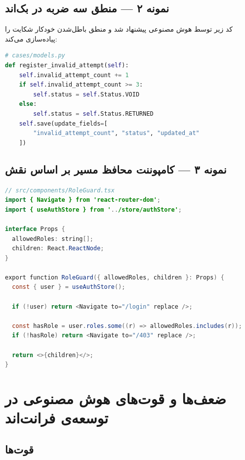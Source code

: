 \documentclass[12pt]{article} %
\theoremstyle{definition}
\begin{document}
\subsection{نمونه ۲ — منطق سه ضربه در بک‌اند}

کد زیر توسط هوش مصنوعی پیشنهاد شد و منطق باطل‌شدن خودکار شکایت را پیاده‌سازی می‌کند:

\begin{latin}
\begin{lstlisting}[language=Python, caption={Complaint three-strike logic (Python)}]
# cases/models.py
def register_invalid_attempt(self):
    self.invalid_attempt_count += 1
    if self.invalid_attempt_count >= 3:
        self.status = self.Status.VOID
    else:
        self.status = self.Status.RETURNED
    self.save(update_fields=[
        "invalid_attempt_count", "status", "updated_at"
    ])
\end{lstlisting}
\end{latin}

\subsection{نمونه ۳ — کامپوننت محافظ مسیر بر اساس نقش}

\begin{latin}
\begin{lstlisting}[language=Java, caption={RoleGuard component (TypeScript/React)}]
// src/components/RoleGuard.tsx
import { Navigate } from 'react-router-dom';
import { useAuthStore } from '../store/authStore';

interface Props {
  allowedRoles: string[];
  children: React.ReactNode;
}

export function RoleGuard({ allowedRoles, children }: Props) {
  const { user } = useAuthStore();

  if (!user) return <Navigate to="/login" replace />;

  const hasRole = user.roles.some((r) => allowedRoles.includes(r));
  if (!hasRole) return <Navigate to="/403" replace />;

  return <>{children}</>;
}
\end{lstlisting}
\end{latin}

\section{ضعف‌ها و قوت‌های هوش مصنوعی در توسعه‌ی فرانت‌اند}

\subsection{قوت‌ها}
\end{document}

